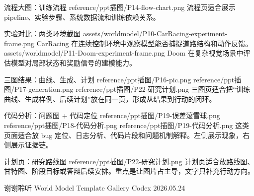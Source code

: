 \documentclass[aspectratio=169]{beamer}
\newcommand{\wmasset}[1]{reference/ppt插图/#1}
\newcommand{\wmgen}[1]{assets/worldmodel/#1}
\begin{document}
\WinterArchitectureFrame
  {流程大图：训练流程}
  {\wmasset{P14-flow-chart.png}}
  {流程页适合展示 pipeline、实验步骤、系统数据流和训练依赖关系。}


\WinterExperimentCompareFrame
  {实验对比：两类环境截图}
  {\wmgen{P10-CarRacing-experiment-frame.png}}
  {CarRacing}
  {在连续控制环境中观察模型能否捕捉道路结构和动作反馈。}
  {\wmgen{P11-Doom-experiment-frame.png}}
  {Doom}
  {在复杂视觉场景中评估模型对局部状态和奖励信号的建模能力。}

\WinterThreeImageResultFrame
  {三图结果：曲线、生成、计划}
  {\wmasset{P16-pic.png}}
  {\wmasset{P17-generation.png}}
  {\wmasset{P22-研究计划.png}}
  {三图页适合把“训练曲线、生成样例、后续计划”放在同一页，形成从结果到行动的闭环。}

\WinterCodeAnalysisFrame
  {代码分析：问题图 + 代码定位}
  {\wmasset{P19-误差滚雪球.png}}
  {\wmasset{P18-代码分析.png}}
  {\wmasset{P19-代码分析.png}}
  {这类页面适合放 bug 定位、日志分析、代码片段和问题机制解释。左侧展示现象，右侧展示证据链。}

\WinterPlanFrame
  {计划页：研究路线图}
  {\wmasset{P22-研究计划.png}}
  {计划页适合放路线图、甘特图、阶段目标或答辩后续安排。重点是让图片占主导，文字只补充行动方向。}


\WinterThanks
  {谢谢聆听}
  {World Model Template Gallery}
  {Codex}
  {2026.05.24}
\end{document}
